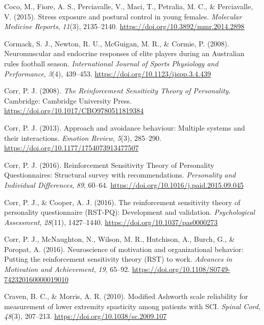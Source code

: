 \documentclass[
  english,
  man,floatsintext]{apa6}
\begin{document}
\leavevmode\hypertarget{ref-Coco2015}{}%
Coco, M., Fiore, A. S., Perciavalle, V., Maci, T., Petralia, M. C., \& Perciavalle, V. (2015). Stress exposure and postural control in young females. \emph{Molecular Medicine Reports}, \emph{11}(3), 2135--2140. \url{https://doi.org/10.3892/mmr.2014.2898}

\leavevmode\hypertarget{ref-Cormack2008}{}%
Cormack, S. J., Newton, R. U., McGuigan, M. R., \& Cormie, P. (2008). Neuromuscular and endocrine responses of elite players during an Australian rules football season. \emph{International Journal of Sports Physiology and Performance}, \emph{3}(4), 439--453. \url{https://doi.org/10.1123/ijspp.3.4.439}

\leavevmode\hypertarget{ref-Corr2008}{}%
Corr, P. J. (2008). \emph{The Reinforcement Sensitivity Theory of Personality}. Cambridge: Cambridge University Press. \url{https://doi.org/10.1017/CBO9780511819384}

\leavevmode\hypertarget{ref-Corr2013}{}%
Corr, P. J. (2013). Approach and avoidance behaviour: Multiple systems and their interactions. \emph{Emotion Review}, \emph{5}(3), 285--290. \url{https://doi.org/10.1177/1754073913477507}

\leavevmode\hypertarget{ref-Corr2016a}{}%
Corr, P. J. (2016). Reinforcement Sensitivity Theory of Personality Questionnaires: Structural survey with recommendations. \emph{Personality and Individual Differences}, \emph{89}, 60--64. \url{https://doi.org/10.1016/j.paid.2015.09.045}

\leavevmode\hypertarget{ref-Corr2016c}{}%
Corr, P. J., \& Cooper, A. J. (2016). The reinforcement sensitivity theory of personality questionnaire (RST-PQ): Development and validation. \emph{Psychological Assessment}, \emph{28}(11), 1427--1440. \url{https://doi.org/10.1037/pas0000273}

\leavevmode\hypertarget{ref-Corr2016b}{}%
Corr, P. J., McNaughton, N., Wilson, M. R., Hutchison, A., Burch, G., \& Poropat, A. (2016). Neuroscience of motivation and organizational behavior: Putting the reinforcement sensitivity theory (RST) to work. \emph{Advances in Motivation and Achievement}, \emph{19}, 65--92. \url{https://doi.org/10.1108/S0749-742320160000019010}

\leavevmode\hypertarget{ref-Craven2010}{}%
Craven, B. C., \& Morris, A. R. (2010). Modified Ashworth scale reliability for measurement of lower extremity spasticity among patients with SCI. \emph{Spinal Cord}, \emph{48}(3), 207--213. \url{https://doi.org/10.1038/sc.2009.107}
\end{document}
